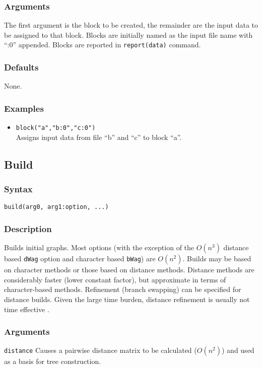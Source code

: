 \documentclass[11pt]{article}
\begin{document}
		\subsubsection{Arguments}
		The first argument is the block to be created, the remainder are the input data to be 
		assigned to that block. Blocks are initially named as the input file name with ``:0'' appended.  Blocks are reported in \texttt{report(data)} command.
		\subsubsection{Defaults}
		None.
		\subsubsection{Examples}
		\begin{itemize}
			\item{\texttt{block("a","b:0","c:0")}\\ Assigns input data from file ``b'' and ``c'' to block ``a''. }
		\end{itemize}
		
	
	
	\subsection{Build}
		\subsubsection{Syntax}
		\texttt{build(arg0, arg1:option, ...)}
		\subsubsection{Description}
		Builds initial graphs.  Most options (with the exception of the $O(n^3)$ distance based \texttt{dWag} option and character based \texttt{bWag})
		are $O(n^2)$.  Builds may be based on character methods or those based on distance methods.  Distance methods are considerably faster 
		(lower constant factor), but approximate in terms of character-based methods.  Refinement (branch swapping) can be specified
		for distance builds.  Given the large time burden, distance refinement is usually not time effective \citep{Wheeler2021}.
		\subsubsection{Arguments}
		\texttt{distance} Causes a pairwise distance matrix to be calculated ($O(n^2)$) and used as a basis for tree construction.
		
\end{document}
